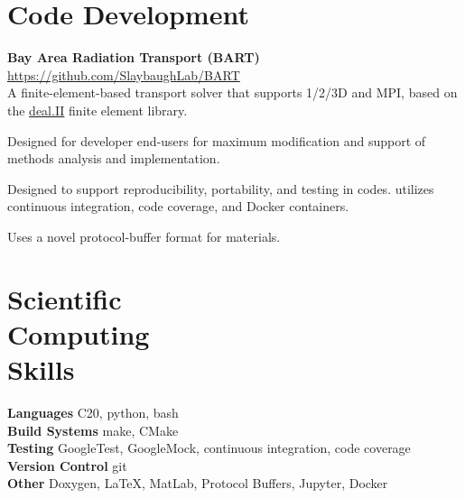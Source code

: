 \documentclass[margin,line]{resume}
\newcommand{\Cpp}[1][]{\textrm{C\nolinebreak[4]\hspace{-.05em}\raisebox{.4ex}{\tiny\bfseries++}#1}}
\begin{document}
\begin{resume}
        
        \section{\mysidestyle Code Development}
        \textbf{Bay Area Radiation Transport (BART)} \hfill
        \url{https://github.com/SlaybaughLab/BART} \\
        A finite-element-based transport solver that
                  supports 1/2/3D and MPI, based on the \href{https://www.dealii.org/}{deal.II}
                  finite element library.
                \begin{list2}
                \item Designed for developer end-users for maximum
                  modification and support of methods analysis and
                  implementation.
                \item Designed to support reproducibility,
                  portability, and testing in codes. utilizes
                  continuous integration, code coverage, and Docker
                  containers.
                \item Uses a novel protocol-buffer format for materials.
                \end{list2}
    \section{\mysidestyle Scientific\\Computing\\Skills}
                \textbf{Languages} \dotfill  \Cpp{20}, python, bash\vspace{1mm}\\%
                \textbf{Build Systems} \dotfill make, CMake \vspace{1mm}\\%
                \textbf{Testing} \dotfill GoogleTest, GoogleMock, continuous integration, code coverage\vspace{1mm}\\%
                \textbf{Version Control} \dotfill git\vspace{1mm}\\%
                \textbf{Other} \dotfill Doxygen, \LaTeX, MatLab,
                Protocol Buffers, Jupyter, Docker \vspace{1mm}%





\end{resume}
\end{document}
